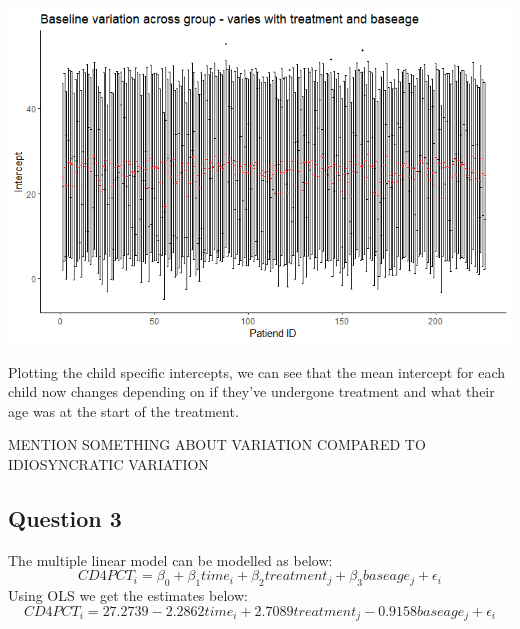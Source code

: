 \documentclass[12pt]{article}
\begin{document}
{\includegraphics[scale=0.6]{Q2}

Plotting the child specific intercepts, we can see that the mean intercept for each child now changes depending on if they've undergone treatment and what their age was at the start of the treatment.

MENTION SOMETHING ABOUT VARIATION COMPARED TO IDIOSYNCRATIC VARIATION


\subsection*{Question 3}
The multiple linear model can be modelled as below:
$$CD4PCT_i = \beta_0 + \beta_1 time_i + \beta_2 treatment_j + \beta_3 baseage_j + \epsilon_i$$
Using OLS we get the estimates below:
$$CD4PCT_i = 27.2739 -2.2862 time_i + 2.7089 treatment_j -0.9158 baseage_j + \epsilon_i$$












}
\end{document}
